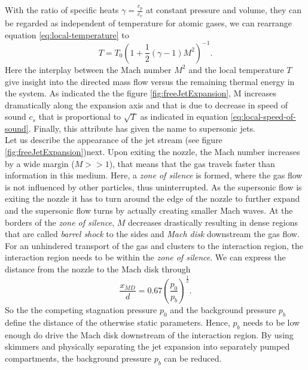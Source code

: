 With the ratio of specific heats $\gamma = \frac{c_{p}}{c_{v}}$ at constant pressure and volume, they can be regarded as independent of temperature for atomic gases, we can rearrange equation \ref{eq:local-temperature} to 
\begin{equation}
T=T_{0}\left(1+\frac{1}{2}\left(\gamma - 1\right)M^{2}\right)^{-1}.
\label{eq:local-temperature-definition}
\end{equation}
Here the interplay between the Mach number $M^{2}$ and the local temperature $T$ give insight into the directed mass flow versus the remaining thermal energy in the system. As indicated the the figure \ref{fig:freeJetExpansion}, M increases dramatically along the expansion axis and that is due to decrease in speed of sound $c_{s}$ that is proportional to $\sqrt{T}$ as indicated in equation \eqref{eq:local-speed-of-sound}. Finally, this attribute has given the name to supersonic jets.\\
Let us describe the appearance of the jet stream (see figure \ref{fig:freeJetExpansion})next. Upon exiting the nozzle, the Mach number increases by a wide margin ($M>>1$), that means that the gas travels faster than information in this medium. Here, a \textit{zone of silence} is formed, where the gas flow is not influenced by other particles, thus uninterrupted. As the supersonic flow is exiting the nozzle it has to turn around the edge of the nozzle to further expand and the supersonic flow turns by actually creating smaller Mach waves. At the borders of the \textit{zone of silence}, $M$ decreases drastically resulting in dense regions that are called \textit{barrel shock} to the sides and \textit{Mach disk} downstream the gas flow. For an unhindered transport of the gas and clusters to the interaction region, the interaction region needs to be within the \textit{zone of silence}. We can express the distance from the nozzle to the Mach disk through
\begin{equation}
\frac{x_{MD}}{d}=0.67\left(\frac{p_{0}}{p_{b}}\right)^{\frac{1}{2}}.
\label{eq:distance-of-mach-disk}
\end{equation}
So the the competing stagnation pressure $p_{0}$ and the background pressure $p_{b}$ define the distance of the otherwise static parameters. Hence, $p_{b}$ needs to be low enough do drive the Mach disk downstream of the interaction region. By using skimmers and physically separating the jet expansion into separately pumped compartments, the background pressure $p_{b}$ can be reduced.\\
